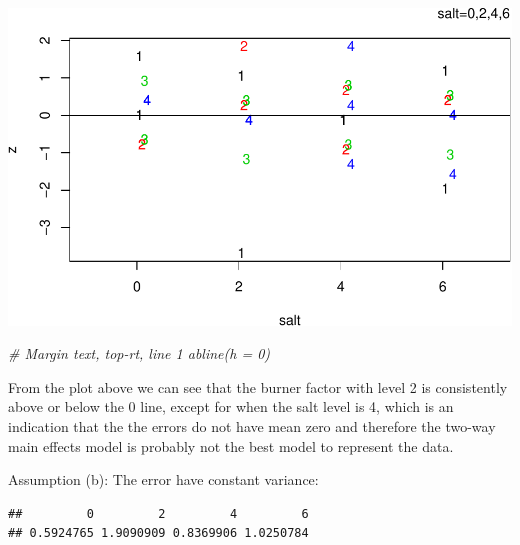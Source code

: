 \documentclass[12pt,]{article}
\newenvironment{Shaded}{\begin{snugshade}}{\end{snugshade}}
\newcommand{\KeywordTok}[1]{\textcolor[rgb]{0.13,0.29,0.53}{\textbf{#1}}}
\newcommand{\StringTok}[1]{\textcolor[rgb]{0.31,0.60,0.02}{#1}}
\newcommand{\CommentTok}[1]{\textcolor[rgb]{0.56,0.35,0.01}{\textit{#1}}}
\newcommand{\OperatorTok}[1]{\textcolor[rgb]{0.81,0.36,0.00}{\textbf{#1}}}
\newcommand{\NormalTok}[1]{#1}
\begin{document}
\includegraphics{Markdown_HW_6_files/figure-latex/unnamed-chunk-11-1.pdf}

\begin{Shaded}
\begin{Highlighting}[]
 \CommentTok{# Margin text, top-rt, line 1 abline(h = 0)}
\end{Highlighting}
\end{Shaded}

From the plot above we can see that the burner factor with level 2 is
consistently above or below the 0 line, except for when the salt level
is 4, which is an indication that the the errors do not have mean zero
and therefore the two-way main effects model is probably not the best
model to represent the data.

Assumption (b): The error have constant variance:

\begin{Shaded}
\end{Shaded}

\begin{verbatim}
##         0         2         4         6 
## 0.5924765 1.9090909 0.8369906 1.0250784
\end{verbatim}

\begin{Shaded}
\end{Shaded}
\end{document}
